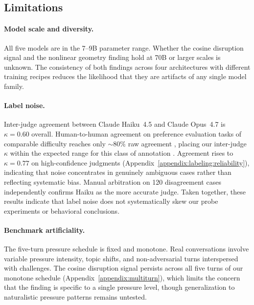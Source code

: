 \documentclass[11pt]{article}
\begin{document}
  \subsection{Limitations}
  \label{subsec:limitations}

  \paragraph{Model scale and diversity.}
  All five models are in the 7--9B parameter range. Whether the cosine disruption
  signal and the nonlinear geometry finding hold at 70B or larger scales is
  unknown. The consistency of both findings across four architectures with
  different training recipes reduces the likelihood that they are artifacts of
  any single model family.

  \paragraph{Label noise.}
  Inter-judge agreement between Claude Haiku~4.5 and Claude Opus~4.7 is
  $\kappa = 0.60$ overall. Human-to-human agreement on preference evaluation
  tasks of comparable difficulty reaches only ${\sim}80\%$ raw agreement
  \citep{10.5555/3666122.3668142}, placing our inter-judge $\kappa$ within the
  expected range for this class of annotation \citep{ouyang2022training}.
  Agreement rises to $\kappa = 0.77$ on high-confidence judgments
  (Appendix~\ref{appendix:labeling:reliability}), indicating that noise
  concentrates in genuinely ambiguous cases rather than reflecting systematic
  bias. Manual arbitration on 120 disagreement cases independently confirms
  Haiku as the more accurate judge. Taken together, these results indicate
  that label noise does not systematically skew our probe experiments or
  behavioral conclusions.

  \paragraph{Benchmark artificiality.}
  The five-turn pressure schedule is fixed and monotone. Real conversations
  involve variable pressure intensity, topic shifts, and non-adversarial
  turns interspersed with challenges. The cosine disruption signal persists
  across all five turns of our monotone schedule
  (Appendix~\ref{appendix:multiturn}), which limits the concern that the
  finding is specific to a single pressure level, though generalization to
  naturalistic pressure patterns remains untested.
\end{document}
